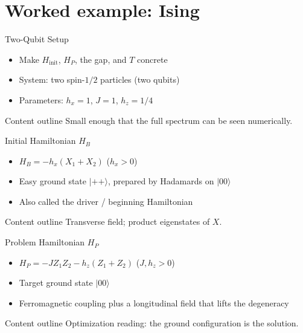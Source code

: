 \documentclass[
	11pt,
	aspectratio=169,
	compress,
]{beamer}
\newcommand{\outlinebox}[1]{%
	\vspace{0.25em}%
	\begin{block}{Content outline}
		#1
	\end{block}
}
\begin{document}
\section{Worked example: Ising}
\begin{frame}{Two-Qubit Setup}
	\begin{itemize}
		\item Make $H_{\mathrm{init}}$, $H_P$, the gap, and $T$ concrete
		\item System: two spin-$1/2$ particles (two qubits)
		\item Parameters: $h_x=1$, $J=1$, $h_z=1/4$
	\end{itemize}
	\outlinebox{Small enough that the full spectrum can be seen numerically.}
\end{frame}

\begin{frame}{Initial Hamiltonian $H_B$}
	\begin{itemize}
		\item $H_B=-h_x(X_1+X_2)$ \quad ($h_x>0$)
		\item Easy ground state $\lvert++\rangle$, prepared by Hadamards on $\lvert00\rangle$
		\item Also called the driver / beginning Hamiltonian
	\end{itemize}
	\outlinebox{Transverse field; product eigenstates of $X$.}
\end{frame}

\begin{frame}{Problem Hamiltonian $H_P$}
	\begin{itemize}
		\item $H_P=-J Z_1Z_2 - h_z(Z_1+Z_2)$ \quad ($J,h_z>0$)
		\item Target ground state $\lvert00\rangle$
		\item Ferromagnetic coupling plus a longitudinal field that lifts the degeneracy
	\end{itemize}
	\outlinebox{Optimization reading: the ground configuration is the solution.}
\end{frame}
\end{document}
